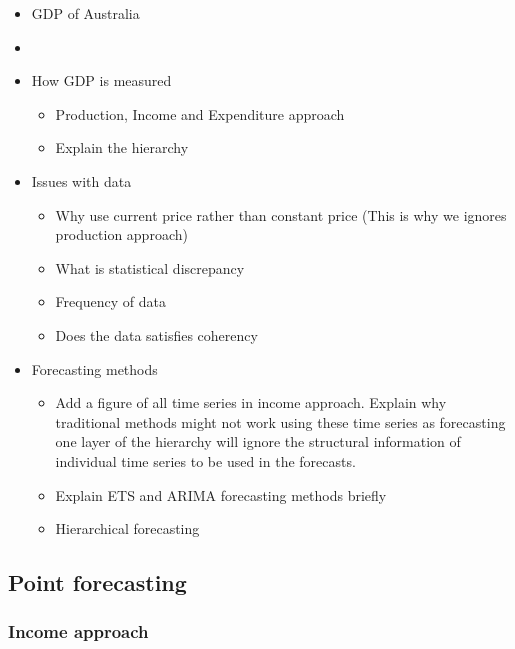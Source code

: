 \documentclass[graybox]{svmult}
\begin{document}
\begin{itemize}
	\item GDP of Australia
	\item []
	\item How GDP is measured
		\begin{itemize}
			\item Production, Income and Expenditure approach
			\item Explain the hierarchy
		\end{itemize}
	\item Issues with data
		\begin{itemize}
			\item Why use current price rather than constant price (This is why we ignores production approach)
			\item What is statistical discrepancy
			\item Frequency of data
			\item Does the data satisfies coherency
		\end{itemize}
	
	\item Forecasting methods
		\begin{itemize}
			\item Add a figure of all time series in income approach.
			Explain why traditional methods might not work using these time series as forecasting one layer of the hierarchy will ignore the structural information of individual time series to be used in the forecasts.
			
			\item Explain ETS and ARIMA forecasting methods briefly
			\item Hierarchical forecasting
		\end{itemize}
\end{itemize}


\subsection{Point forecasting}

\subsubsection{Income approach}
\end{document}
